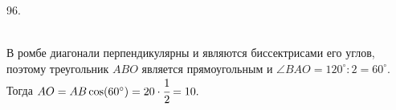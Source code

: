 96. \begin{figure}[ht!]
\end{figure}\\
В ромбе диагонали перпендикулярны и являются биссектрисами его углов, поэтому треугольник $ABO$ является прямоугольным и $\angle BAO=120^\circ:2=60^\circ.$ Тогда $AO=AB\cos(60^\circ)=20\cdot\cfrac{1}{2}=10.$\\

